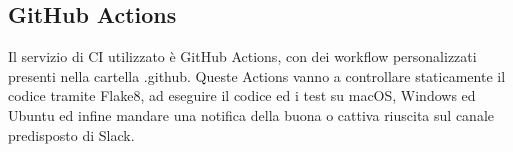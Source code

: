 \subsection{GitHub Actions}
Il servizio di CI utilizzato è GitHub Actions, con dei workflow personalizzati presenti nella cartella .github. Queste Actions vanno a controllare staticamente il codice tramite Flake8, ad eseguire il codice ed i test su macOS, Windows ed Ubuntu ed infine mandare una notifica della buona o cattiva riuscita sul canale predisposto di Slack.
